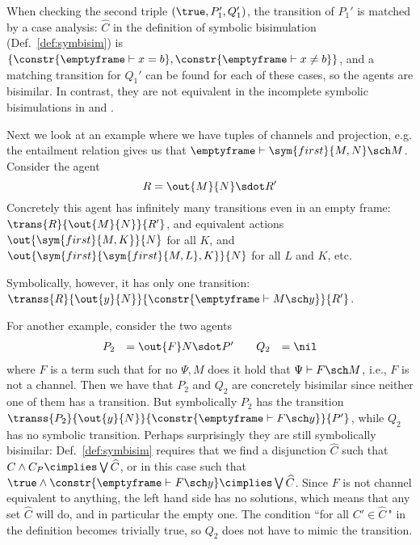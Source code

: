 \documentclass{eptcs}
\theoremstyle{definition}
\begin{document}
When checking the second triple $(\true,P_1',Q_1')$, the transition of
$P_1'$ is matched by a case analysis: $\widehat{C}$ in the definition of symbolic bisimulation (Def.~\ref{def:symbisim}) is
$\{\constr{\emptyframe \vdash x=b}, \constr{\emptyframe \vdash x\neq
b}\}$, and a matching transition for $Q_1'$ can be found for each of
these cases, so the agents are bisimilar.
In contrast,
they are not equivalent in the incomplete
symbolic bisimulations in
\cite{borgstroem.briais.ea:symbolic-bisimulation} and
\cite{DBLP:conf/fsttcs/DelauneKR07}.

Next we look at an example where we have tuples of channels and projection,
e.g. the entailment relation gives us that $\emptyframe \vdash \sym{first}{M,N}
\sch M$. Consider the agent
\[
 R = \out{M}{N}\sdot R'
\]
Concretely this agent has infinitely many transitions even in an empty frame: $\trans{R}{\out{M}{N}}{R'}$, 
\iftrue and equivalent actions $\out{\sym{first}{M,K}}{N}$ 
for all $K$, and
$\out{\sym{first}{\sym{first}{M,L},K}}{N}$ 
for all $L$ and $K$, etc.
\else
and equivalently $\trans{R}{\out{\sym{first}{M,K}}{N}}{R'}$ 
for all $K$, and
$\trans{R}{\out{\sym{first}{\sym{first}{M,L},K}}{N}}{R'}$ 
for all $L$ and $K$, etc.
\fi
Symbolically, however, it has
only one transition: $\transs{R}{\out{y}{N}}{\constr{\emptyframe \vdash M \sch y}}{R'}$.

For another example, consider the two agents
\[
\begin{array}{rl@{\qquad}rl}
 P_2 &= \out{F}N\sdot P' &Q_2 &= \nil
\end{array} 
\]
where $F$ is a term such that for no $\Psi,M$ does it hold that $\Psi \vdash F \sch M$, i.e., $F$ is not a channel. Then we have that $P_2$ and $Q_2$ are concretely bisimilar since
neither one of them has a transition. But symbolically $P_2$ has the
transition $\transs{P_2}{\out{y}{N}}{\constr{\emptyframe \vdash F \sch y}}{P'}$, while
$Q_2$ has no symbolic transition. Perhaps surprisingly they are still symbolically
bisimilar: Def.~\ref{def:symbisim} requires that we find a
disjunction $\widehat{C}$ such that $C \wedge C_P \cimplies \bigvee\widehat{C}$, or in
this case such that $\true \wedge \constr{\emptyframe \vdash F \sch y}
\cimplies \bigvee\widehat{C}$. Since $F$ is not channel equivalent to
anything, the left hand side has no solutions, which means that any set
$\widehat{C}$ will do, and in particular the empty one.
The condition ``for all $C'\in\widehat{C}\,$" in the definition becomes
trivially true, so $Q_2$ does not have to mimic the transition.
\end{document}
